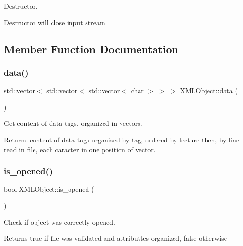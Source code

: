 Destructor. 

Destructor will close input stream 

\subsection{Member Function Documentation}
\mbox{\label{class_x_m_l_object_ad13f036055b76b4d2d08e64f85703df0}} 
\subsubsection{\texorpdfstring{data()}{data()}}
{\footnotesize\ttfamily std\+::vector$<$ std\+::vector$<$ std\+::vector$<$ char $>$ $>$ $>$ X\+M\+L\+Object\+::data (\begin{DoxyParamCaption}{ }\end{DoxyParamCaption})}



Get content of data tags, organized in vectors. 

\begin{DoxyReturn}{Returns}
content of data tags organized by tag, ordered by lecture then, by line read in file, each caracter in one position of vector. 
\end{DoxyReturn}
\mbox{\label{class_x_m_l_object_a14d88964a98069618d6eb370fdb5bcc8}} 
\subsubsection{\texorpdfstring{is\+\_\+opened()}{is\_opened()}}
{\footnotesize\ttfamily bool X\+M\+L\+Object\+::is\+\_\+opened (\begin{DoxyParamCaption}{ }\end{DoxyParamCaption})}



Check if object was correctly opened. 

\begin{DoxyReturn}{Returns}
true if file was validated and attributtes organized, false otherwise 
\end{DoxyReturn}
\mbox{\label{class_x_m_l_object_ad418af64a7ad3050842e7901ffd0c309}} 

